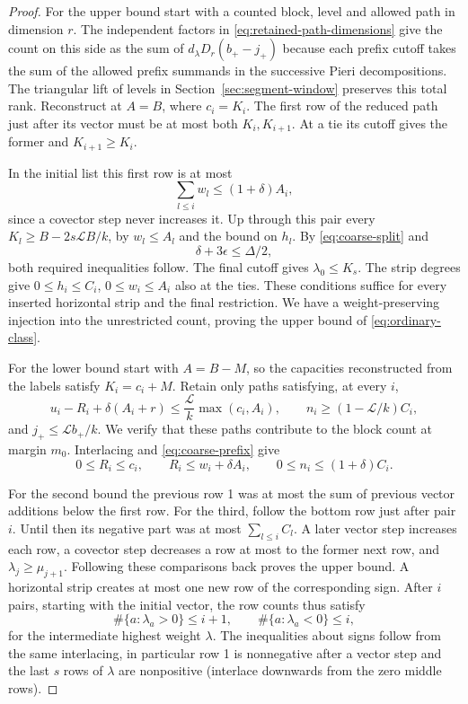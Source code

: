 \begin{proof}
For the upper bound start with a counted block, level and
allowed path in dimension \(r\). The independent factors in \eqref{eq:retained-path-dimensions}
give the count on this side as the sum of \(d_\lambda D_r(b_+-j_+)\) because each prefix
cutoff takes the sum of the allowed prefix summands in the
successive Pieri decompositions. The triangular lift of levels
in Section~\ref{sec:segment-window} preserves this total rank.
Reconstruct at \(A=B\), where \(c_i=K_i\). The first row of the
reduced path just after its vector must be at most both
\(K_i,K_{i+1}\). At a tie its cutoff gives the former and
\(K_{i+1}\ge K_i\).

In the initial list this first row is at
most
\[
 \sum_{l\le i}w_l\le(1+\delta)A_i,
\]
since a covector
step never increases it. Up through this pair every
\(K_l\ge B-2s\mathcal L B/k\), by \(w_l\le A_l\) and the
bound on \(h_l\). By \eqref{eq:coarse-split} and
\[
 \delta+3\epsilon\le\Delta/2,
\]
both required inequalities
follow. The final cutoff gives \(\lambda_0\le K_s\). The strip
degrees give \(0\le h_i\le C_i\), \(0\le w_i\le A_i\)
also at the ties. These conditions suffice for every inserted
horizontal strip and the final restriction. We have a
weight-preserving injection into the unrestricted count,
proving the upper bound of \eqref{eq:ordinary-class}.

For the lower bound start with \(A=B-M\), so the capacities
reconstructed from the labels satisfy \(K_i=c_i+M\). Retain
only paths satisfying, at every \(i\),
\begin{equation}\label{eq:kept-tail}
 u_i-R_i+\delta(A_i+r)\le \frac{\mathcal L}{k}\max(c_i,A_i),
 \qquad n_i\ge (1-\mathcal L/k)C_i ,
\end{equation}
and \(j_+\le\mathcal L b_+/k\).
We verify that these paths contribute to the block count at
margin \(m_0\). Interlacing and \eqref{eq:coarse-prefix} give
\[
 0\le R_i\le c_i,\qquad
 R_i\le w_i+\delta A_i,\qquad
 0\le n_i\le(1+\delta)C_i .
\]

For the second bound the previous row 1 was at most the sum of
previous vector additions below the first row. For the third,
follow the bottom row just after pair \(i\). Until then its
negative part was at most \(\sum_{l\le i} C_l\). A later vector
step increases each row, a covector step decreases a row at
most to the former next row, and \(\lambda_j\ge\mu_{j+1}\).
Following these comparisons back proves the upper bound. A horizontal strip creates at most one new row of the corresponding sign. After \(i\) pairs, starting with the initial vector, the row counts thus satisfy 
\[
 \#\{a:\lambda_a>0\}\le i+1,\qquad\#\{a:\lambda_a<0\}\le i,
\]
 for the intermediate highest weight \(\lambda\). The inequalities about signs follow
from the same interlacing, in particular row 1 is nonnegative
after a vector step and the last \(s\) rows of \(\lambda\) are
nonpositive (interlace downwards from the zero middle rows).


\end{proof}
